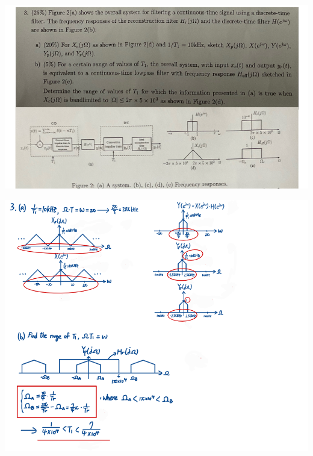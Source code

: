 \documentclass[a4paper]{article}
\begin{document}
	\begin{center}
		\includegraphics[width=1\linewidth]{screenshot127}
	\end{center}
	\begin{center}
		\includegraphics[width=1\linewidth]{screenshot128}
	\end{center}
	
\end{document}

